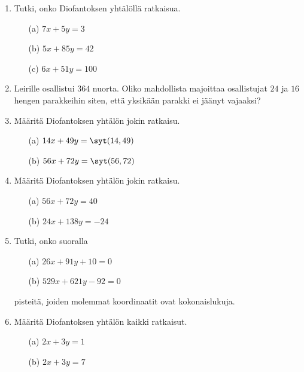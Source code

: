 


\Harjoitustehtavat

\begin{enumerate}

\item Tutki, onko Diofantoksen yhtälöllä ratkaisua.
\begin{itemize}
\item[(a)] $7x + 5y = 3$
\item[(b)] $5x + 85y = 42$
\item[(c)] $6x + 51y = 100$
\end{itemize}

\item Leirille osallistui $364$ nuorta. Oliko mahdollista majoittaa osallistujat $24$ ja $16$ hengen parakkeihin siten, että yksikään parakki ei jäänyt vajaaksi?

\item Määritä Diofantoksen yhtälön jokin ratkaisu.
\begin{itemize}
\item[(a)] $14x + 49y = \syt(14,49)$
\item[(b)] $56x + 72y = \syt(56,72)$
\end{itemize}

\item Määritä Diofantoksen yhtälön jokin ratkaisu.
\begin{itemize}
\item[(a)] $56x + 72y = 40$
\item[(b)] $24x + 138y = -24$
\end{itemize}

\item Tutki, onko suoralla
\begin{itemize}
\item[(a)] $26x + 91y + 10 = 0$
\item[(b)] $529x + 621y - 92 = 0$
\end{itemize}
pisteitä, joiden molemmat koordinaatit ovat kokonaislukuja.

\item Määritä Diofantoksen yhtälön kaikki ratkaisut.
\begin{itemize}
\item[(a)] $2x + 3y = 1$
\item[(b)] $2x + 3y = 7$
\end{itemize}


\end{enumerate}
